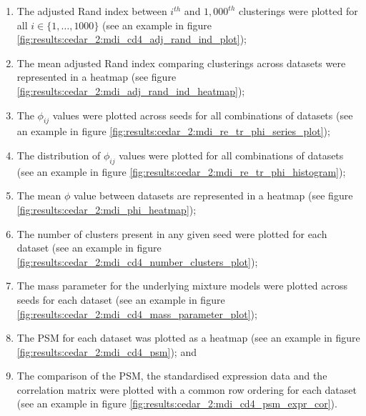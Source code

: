 \documentclass[12pt]{article} %
\begin{document}
	\begin{enumerate}
		\item The adjusted Rand index between $i^{th}$ and $1,000^{th}$ clusterings were plotted for all $i\in \{1,\ldots,1000\}$ (see an example in figure \ref{fig:results:cedar_2:mdi_cd4_adj_rand_ind_plot});
		\item The mean adjusted Rand index comparing clusterings across datasets were represented in a heatmap (see figure \ref{fig:results:cedar_2:mdi_adj_rand_ind_heatmap});
		\item The $\phi_{ij}$ values were plotted across seeds for all combinations of datasets (see an example in  figure \ref{fig:results:cedar_2:mdi_re_tr_phi_series_plot});
		\item The distribution of $\phi_{ij}$ values were plotted for all combinations of datasets (see an example in  figure \ref{fig:results:cedar_2:mdi_re_tr_phi_histogram});
		\item The mean $\phi$ value between datasets are represented in a heatmap (see figure \ref{fig:results:cedar_2:mdi_phi_heatmap});
		\item The number of clusters present in any given seed were plotted for each dataset (see an example in  figure \ref{fig:results:cedar_2:mdi_cd4_number_clusters_plot});
		\item The mass parameter for the underlying mixture models were plotted across seeds for each dataset (see an example in  figure \ref{fig:results:cedar_2:mdi_cd4_mass_parameter_plot});
		\item The PSM for each dataset was plotted as a heatmap (see an example in  figure \ref{fig:results:cedar_2:mdi_cd4_psm}); and
		\item The comparison of the PSM, the standardised expression data and the correlation matrix were plotted with a common row ordering for each dataset (see an example in  figure \ref{fig:results:cedar_2:mdi_cd4_psm_expr_cor}). %
	\end{enumerate}
	
	
\end{document}
